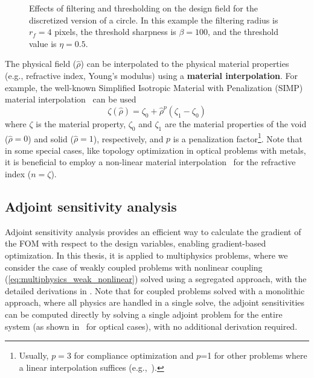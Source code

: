     \begin{figure}[tb]
        \centering

        \caption{Effects of filtering and thresholding on the design field for the discretized
        version of a circle. In this example the filtering radius is $r_f=4$ pixels, the threshold sharpness is 
        $\beta=100$, and the threshold value is $\eta=0.5$.}
        \label{fig:ft}
    \end{figure}

    The physical field ($\hat{\rho}$) can be interpolated to the physical material properties (e.g., refractive index, Young's
    modulus) using a
    \textbf{material interpolation}. For example, the well-known Simplified Isotropic Material with Penalization (SIMP) material interpolation~\cite{SIMP} can be used
    \begin{equation}
        \zeta(\hat{\rho})=\zeta_0+\hat{\rho}^p\left(\zeta_1-\zeta_0\right)
    \end{equation}
 where $\zeta$ is the material property, $\zeta_0$ and $\zeta_1$ are the
 material properties of the void ($\hat{\rho}=0$) and solid ($\hat{\rho}=1$), respectively, and $p$
 is a penalization factor\footnote{Usually, $p=3$ for compliance optimization and $p$=1
 for other problems where a linear interpolation suffices (e.g.,~\cite{ownpub3,ownpub4}).}. Note that in some
 special cases, like topology optimization in optical problems with metals, it is beneficial
 to employ a non-linear material interpolation~\cite{nonlinear_interp,ownpub0} for the refractive index ($n=\zeta$).

    \subsection*{Adjoint sensitivity analysis}

    Adjoint sensitivity analysis provides an efficient way to calculate the gradient of the FOM with respect to the design variables,
 enabling gradient-based optimization. In this thesis, it is applied to multiphysics problems,
 where we consider the case of weakly coupled problems with
 nonlinear coupling (\eqref{eq:multiphysics_weak_nonlinear}) solved using a segregated approach, with the detailed derivations in 
    . Note that for coupled problems solved with a monolithic approach, where all physics are handled
 in a single solve, the adjoint sensitivities can be computed directly by solving a single adjoint problem for the entire
 system (as shown in~\cite{jensen_review} for optical cases), with no additional derivation required.

